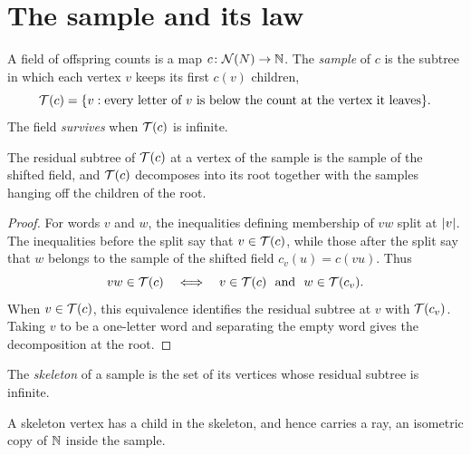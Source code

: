 \chapter{The sample and its law}
\label{ch:sample}

\begin{definition}
\label{def:sample}
\leanok
A field of offspring counts is a map $c\colon\mathcal{N}(N)\to\mathbb{N}$. The \emph{sample} of $c$ is the
subtree in which each vertex $v$ keeps its first $c(v)$ children,
\[
  \mathcal{T}(c)=\{v : \text{every letter of } v \text{ is below the count at the vertex it leaves}\}.
\]
The field \emph{survives} when $\mathcal{T}(c)$ is infinite.
\end{definition}

\begin{lemma}
\label{lem:branching}
\leanok
The residual subtree of $\mathcal{T}(c)$ at a vertex of the sample is the sample of the shifted
field, and $\mathcal{T}(c)$ decomposes into its root together with the samples hanging off the
children of the root.
\end{lemma}

\begin{proof}
\leanok
For words $v$ and $w$, the inequalities defining membership of $vw$ split at
$\lvert v \rvert$. The inequalities before the split say that $v\in\mathcal{T}(c)$, while those after
the split say that $w$ belongs to the sample of the shifted field
$c_v(u)=c(vu)$. Thus
\[
  vw\in\mathcal{T}(c)
  \quad\Longleftrightarrow\quad
  v\in\mathcal{T}(c)\ \text{ and }\ w\in\mathcal{T}(c_v).
\]
When $v\in\mathcal{T}(c)$, this equivalence identifies the residual subtree at $v$ with
$\mathcal{T}(c_v)$. Taking $v$ to be a one-letter word and separating the empty word gives the
decomposition at the root.
\end{proof}

\begin{definition}
\label{def:skeleton}
\leanok
The \emph{skeleton} of a sample is the set of its vertices whose residual subtree is infinite.
\end{definition}

\begin{lemma}
\label{lem:skeleton-ray}
\leanok
A skeleton vertex has a child in the skeleton, and hence carries a ray, an isometric copy of
$\mathbb{N}$ inside the sample.
\end{lemma}

